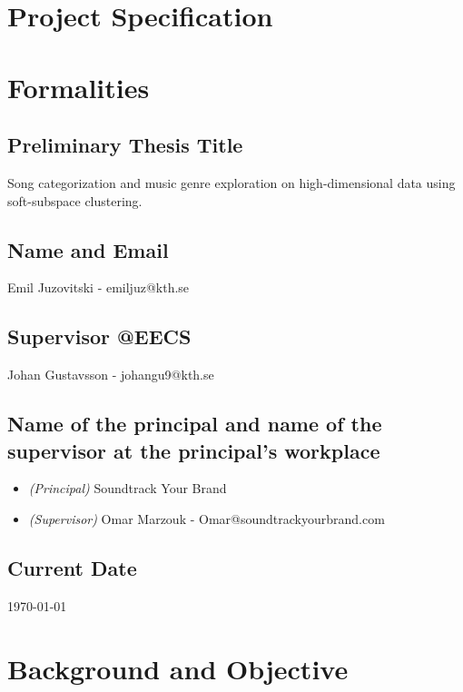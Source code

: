 \documentclass[a4paper,11pt]{article}
\begin{document}
\section*{Project Specification}

\section{Formalities}

\subsection{Preliminary Thesis Title}
Song categorization and
music genre exploration on high-dimensional data using soft-subspace clustering.

\subsection{Name and Email}

Emil Juzovitski - emiljuz@kth.se

\subsection{Supervisor @EECS}

Johan Gustavsson - johangu9@kth.se

\subsection{Name of the principal and name of the supervisor at the
principal's workplace}

\begin{itemize}
\item
  \textit{(Principal)} Soundtrack Your Brand
\item
  \textit{(Supervisor)} Omar Marzouk - Omar@soundtrackyourbrand.com
\end{itemize}

\subsection{Current Date}

\today

\pagebreak

\section{Background and Objective}
\end{document}
